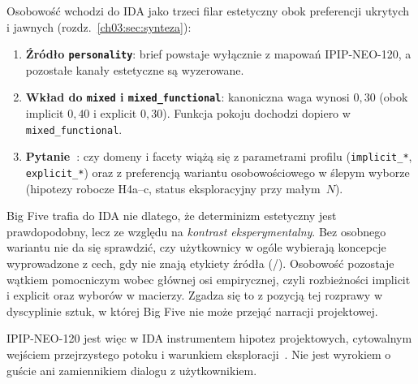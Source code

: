 Osobowość wchodzi do IDA jako trzeci filar estetyczny obok preferencji ukrytych i jawnych (rozdz.~\ref{ch03:sec:synteza}):
\begin{enumerate}
  \item \textbf{Źródło \texttt{personality}}: brief powstaje wyłącznie z mapowań IPIP-NEO-120, a pozostałe kanały estetyczne są wyzerowane.
  \item \textbf{Wkład do \texttt{mixed} i \texttt{mixed\_functional}}: kanoniczna waga wynosi $0{,}30$ (obok implicit $0{,}40$ i explicit $0{,}30$). Funkcja pokoju dochodzi dopiero w \texttt{mixed\_functional}.
  \item \textbf{Pytanie~}: czy domeny i facety wiążą się z parametrami profilu (\texttt{implicit\_*}, \texttt{explicit\_*}) oraz z preferencją wariantu osobowościowego w ślepym wyborze (hipotezy robocze H4a--c, status eksploracyjny przy małym~$N$).
\end{enumerate}

Big Five trafia do IDA nie dlatego, że determinizm estetyczny jest prawdopodobny, lecz ze względu na \emph{kontrast eksperymentalny}. Bez osobnego wariantu nie da się sprawdzić, czy użytkownicy w ogóle wybierają koncepcje wyprowadzone z cech, gdy nie znają etykiety źródła (/).
Osobowość pozostaje wątkiem pomocniczym wobec głównej osi empirycznej, czyli rozbieżności implicit i explicit oraz wyborów w macierzy. Zgadza się to z pozycją tej rozprawy w dyscyplinie sztuk, w której Big Five nie może przejąć narracji projektowej.

IPIP-NEO-120 jest więc w IDA instrumentem hipotez projektowych, cytowalnym wejściem przejrzystego potoku i warunkiem eksploracji~. Nie jest wyrokiem o guście ani zamiennikiem dialogu z użytkownikiem.

